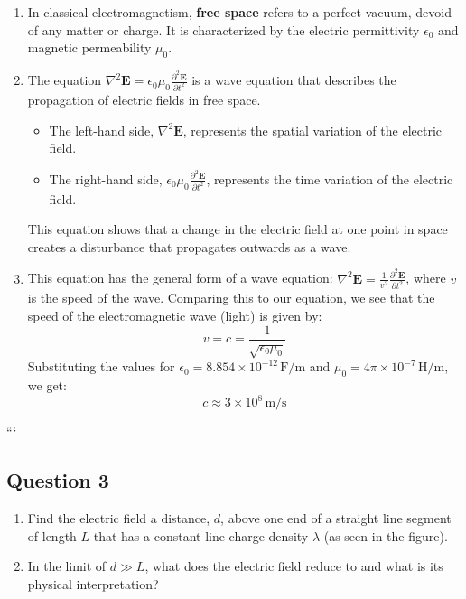 \documentclass{article}
\begin{document}
\begin{enumerate}
\item In classical electromagnetism, \textbf{free space} refers to a perfect vacuum, devoid of any matter or charge. It is characterized by the electric permittivity $\epsilon_0$ and magnetic permeability $\mu_0$. 

\item The equation $\nabla^2 \mathbf{E} = \epsilon_0 \mu_0 \frac{\partial^2 \mathbf{E}}{\partial t^2}$ is a wave equation that describes the propagation of electric fields in free space. 
    \begin{itemize}
        \item The left-hand side, $\nabla^2 \mathbf{E}$, represents the spatial variation of the electric field.
        \item The right-hand side, $\epsilon_0 \mu_0 \frac{\partial^2 \mathbf{E}}{\partial t^2}$, represents the time variation of the electric field. 
    \end{itemize}
    This equation shows that a change in the electric field at one point in space creates a disturbance that propagates outwards as a wave.

\item  This equation has the general form of a wave equation: $\nabla^2 \mathbf{E} = \frac{1}{v^2} \frac{\partial^2 \mathbf{E}}{\partial t^2}$, where $v$ is the speed of the wave.  Comparing this to our equation, we see that the speed of the electromagnetic wave (light) is given by:
    \[
    v = c = \frac{1}{\sqrt{\epsilon_0 \mu_0}} 
    \]
    Substituting the values for $\epsilon_0 = 8.854 \times 10^{-12} \, \text{F/m}$ and $\mu_0 = 4\pi \times 10^{-7} \, \text{H/m}$, we get:
    \[
    c \approx 3 \times 10^8 \, \text{m/s}
    \]
\end{enumerate}
```

\subsection{Question 3}
\begin{enumerate}
    \item Find the electric field a distance, \( d \), above one end of a straight line segment of length \( L \) that has a constant line charge density \( \lambda \) (as seen in the figure).
    \item In the limit of \( d \gg L \), what does the electric field reduce to and what is its physical interpretation?
\end{enumerate}
\end{document}
